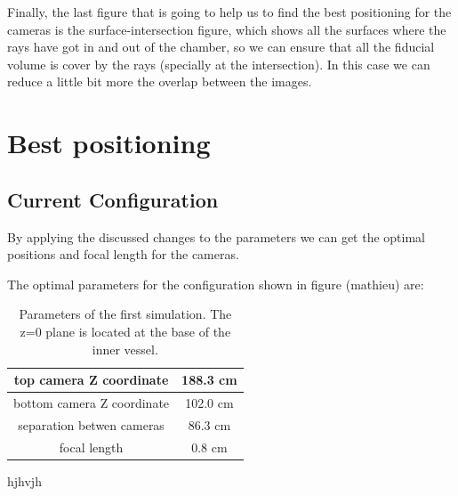 \documentclass{article}
\begin{document}
Finally, the last figure that is going to help us to find the best positioning for the cameras is the surface-intersection figure, which shows all the surfaces where the rays have got in and out of the chamber, so we can ensure that all the fiducial volume is cover by the rays (specially at the intersection). In this case we can reduce a little bit more the overlap between the images.



\section{Best positioning}

\subsection*{Current Configuration}
By applying the discussed changes to the parameters we can get the optimal positions and focal length for the cameras.

The optimal parameters for the configuration shown in figure (mathieu) are:

\begin{table}[]
    \centering
    \begin{tabular}{|c|c|}
        \hline
        top camera Z coordinate &  188.3 cm\\
        \hline
        bottom camera Z coordinate & 102.0 cm\\
        \hline
        separation betwen cameras & 86.3 cm\\
        \hline
        focal length & 0.8 cm\\
        \hline
        
    \end{tabular}
    \caption{Parameters of the first simulation. The z=0 plane is located at the base of the inner vessel.}
    \label{tab:my_label}
\end{table}




hjhvjh
\end{document}
